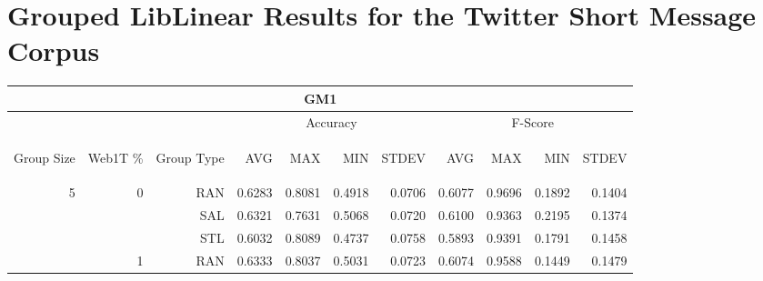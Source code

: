 \chapter{Grouped LibLinear Results for the Twitter Short Message Corpus}

\begin{center}
\begin{table}[htbp]
\begin{tabular}{ | r | r | r | r | r | r | r | r | r | r | r |}
\hline
\multicolumn{11}{|c|}{GM1}\\
\hline
 & & & \multicolumn{4}{|c|}{Accuracy} & \multicolumn{4}{|c|}{F-Score}\\ \cline{4-11}
\begin{sideways}Group Size\end{sideways} & \begin{sideways}Web1T \%\end{sideways} & \begin{sideways}Group Type\end{sideways} & \begin{sideways}AVG\end{sideways} & \begin{sideways}MAX\end{sideways} & \begin{sideways}MIN\end{sideways} & \begin{sideways}STDEV\end{sideways} & \begin{sideways}AVG\end{sideways} & \begin{sideways}MAX\end{sideways} & \begin{sideways}MIN\end{sideways} & \begin{sideways}STDEV\end{sideways}\\
\hline
\multirow{18}{*}{5}
 & \multirow{3}{*}{0} & RAN & 0.6283 & 0.8081 & 0.4918 & 0.0706 & 0.6077 & 0.9696 & 0.1892 & 0.1404\\ \cline{3-11}
 &   & SAL & 0.6321 & 0.7631 & 0.5068 & 0.0720 & 0.6100 & 0.9363 & 0.2195 & 0.1374\\ \cline{3-11}
 &   & STL & 0.6032 & 0.8089 & 0.4737 & 0.0758 & 0.5893 & 0.9391 & 0.1791 & 0.1458\\ \cline{2-11}
 & \multirow{3}{*}{1} & RAN & 0.6333 & 0.8037 & 0.5031 & 0.0723 & 0.6074 & 0.9588 & 0.1449 & 0.1479\\ \cline{3-11}

\end{tabular}
\end{table}
\end{center}
